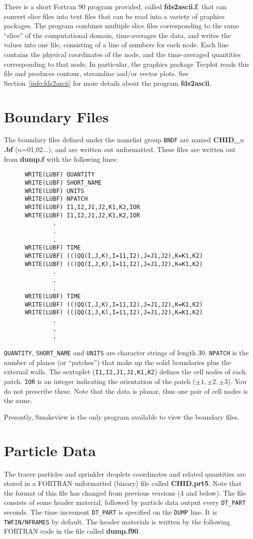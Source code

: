 \documentclass[11pt]{book}
\newcommand{\ct}{\tt\small}
\begin{document}
There is a short Fortran 90 program provided, called
{\bf fds2ascii.f},
that can convert slice files into text files that can be read
into a variety of graphics packages. The program combines multiple
slice files corresponding to the same ``slice'' of the computational
domain, time-averages the data, and writes the values into one file,
consisting of a line of numbers for each node. Each line contains the
physical coordinates of the node, and the time-averaged quantities
corresponding to that node. In particular, the graphics package
Tecplot
reads this file and produces contour, streamline and/or vector plots.
See Section~\ref{info:fds2ascii} for more details about the program
{\bf fds2ascii}.

\section{Boundary Files}%
\label{out:BNDF}
The boundary files defined under the namelist group {\ct BNDF} are
named {\bf CHID\_$n$.bf} ($n$=01,02...),
and are written out unformatted.
These files are written out from {\bf dump.f} with the following lines:

\footnotesize
\begin{verbatim}
      WRITE(LUBF) QUANTITY
      WRITE(LUBF) SHORT_NAME
      WRITE(LUBF) UNITS
      WRITE(LUBF) NPATCH
      WRITE(LUBF) I1,I2,J1,J2,K1,K2,IOR
      WRITE(LUBF) I1,I2,J1,J2,K1,K2,IOR
              .
              .
              .
      WRITE(LUBF) TIME
      WRITE(LUBF) (((QQ(I,J,K),I=11,I2),J=J1,J2),K=K1,K2)
      WRITE(LUBF) (((QQ(I,J,K),I=11,I2),J=J1,J2),K=K1,K2)
              .
              .
              .
      WRITE(LUBF) TIME
      WRITE(LUBF) (((QQ(I,J,K),I=11,I2),J=J1,J2),K=K1,K2)
      WRITE(LUBF) (((QQ(I,J,K),I=11,I2),J=J1,J2),K=K1,K2)
              .
              .
              .
\end{verbatim}
\normalsize
{\ct QUANTITY}, {\ct SHORT\_NAME} and {\ct UNITS} are
character strings of length 30.
{\ct NPATCH} is the number of planes (or ``patches'') that make up the
solid boundaries plus the external walls.
The sextuplet ({\ct I1,I2,J1,J2,K1,K2}) defines the cell nodes of each
patch. {\ct IOR} is an integer indicating the orientation of the
patch ($\pm 1,\pm 2,\pm 3$).
You do not prescribe these. Note that the data is planar,
thus one pair of cell nodes is the same.

Presently, Smokeview is the only program available to view the
boundary files.

\section{Particle Data}%
\label{out:PART}
The tracer particles and sprinkler droplets coordinates and related quantities
are stored in a FORTRAN unformatted (binary) file called {\bf CHID.prt5}.
Note that the format of this file has changed from previous versions (4 and below).
The file consists of some header material, followed by particle data output every
{\ct DT\_PART} seconds. The time increment {\ct DT\_PART} is specified on the
{\ct DUMP} line. It is {\ct TWFIN/NFRAMES} by default.
The header materials is written by the following FORTRAN code in the file called {\bf dump.f90}.
\end{document}
